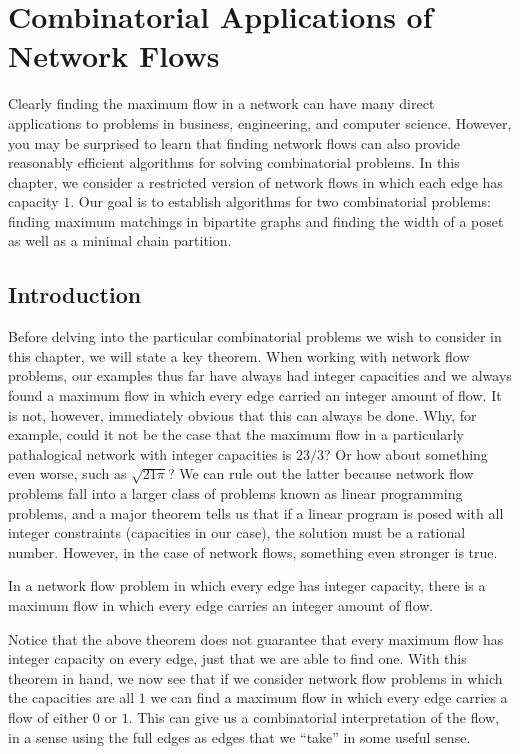 
\chapter{Combinatorial Applications of Network
  Flows}\label{ch:flowapplications}

Clearly finding the maximum flow in a network can have many direct
applications to problems in business, engineering, and computer
science. However, you may be surprised to learn that finding network
flows can also provide reasonably efficient algorithms for solving
combinatorial problems. In this chapter, we consider a restricted
version of network flows in which each edge has capacity $1$. Our goal
is to establish algorithms for two combinatorial problems: finding
maximum matchings in bipartite graphs and finding the width of a poset
as well as a minimal chain partition.

\section{Introduction}

Before delving into the particular combinatorial problems we wish to
consider in this chapter, we will state a key theorem. When working
with network flow problems, our examples thus far have always had
integer capacities and we always found a maximum flow in which every
edge carried an integer amount of flow. It is not, however,
immediately obvious that this can always be done. Why, for example,
could it not be the case that the maximum flow in a particularly
pathalogical network with integer capacities is $23/3$? Or how about
something even worse, such as $\sqrt{21\pi}$?  We can rule out the
latter because network flow problems fall into a larger class of
problems known as linear programming problems, and a major theorem
tells us that if a linear program is posed with all integer
constraints (capacities in our case), the solution must be a rational
number. However, in the case of network flows, something even stronger
is true.
\begin{theorem}
  In a network flow problem in which every edge has integer capacity,
  there is a maximum flow in which every edge carries an integer
  amount of flow.
\end{theorem}

Notice that the above theorem does not guarantee that every maximum
flow has integer capacity on every edge, just that we are able to find
one. With this theorem in hand, we now see that if we consider
network flow problems in which the capacities are all $1$ we can find
a maximum flow in which every edge carries a flow of either $0$ or
$1$. This can give us a combinatorial interpretation of the flow, in a
sense using the full edges as edges that we ``take'' in some useful
sense.

